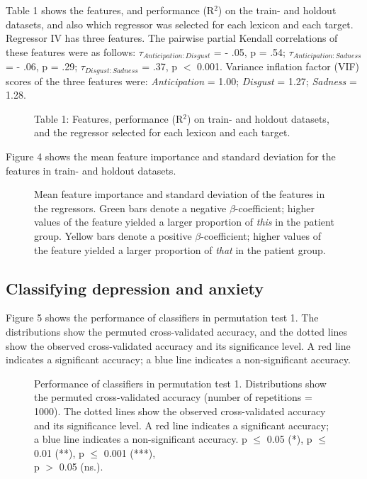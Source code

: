 \documentclass[11pt, a4paper]{article}
\begin{document}
Table 1 shows the features, and performance (R$^2$) on the train- and holdout datasets, and also which regressor was selected for each lexicon and each target.\\
Regressor IV has three features. The pairwise partial Kendall correlations of these features were as follows: $\tau_{Anticipation:Disgust}$ = - .05, p = .54; $\tau_{Anticipation:Sadness}$ = - .06, p = .29; $\tau_{Disgust:Sadness}$ = .37, p $<$ 0.001. Variance inflation factor (VIF) scores of the three features were: \textit{Anticipation} = 1.00; \textit{Disgust} = 1.27; \textit{Sadness} = 1.28. 

\begin{figure}[hbt!]
\centering

\caption*{Table 1:  Features, performance (R$^2$) on train- and holdout datasets, and the regressor selected for each lexicon and each target.}
\end{figure}

Figure 4 shows the mean feature importance and standard deviation for the features in train- and holdout datasets. 

\begin{figure}[hbt!]
\centering

\caption{\label{fig:data} Mean feature importance and standard deviation of the features in the regressors. Green bars denote a negative $\beta$-coefficient; higher values of the feature yielded a larger proportion of \textit{this} in the patient group. Yellow bars denote a positive $\beta$-coefficient; higher values of the feature yielded a larger proportion of \textit{that} in the patient group.}
\end{figure}

\newpage
\subsection{Classifying depression and anxiety}

Figure 5 shows the performance of classifiers in permutation test 1. The distributions show the permuted cross-validated accuracy, and the dotted lines show the observed cross-validated accuracy and its significance level. A red line indicates a significant accuracy; a blue line indicates a non-significant accuracy.

\begin{figure}[hbt!]
\centering

\caption{\label{fig:data} Performance of classifiers in permutation test 1. Distributions show the permuted cross-validated accuracy (number of repetitions = 1000). The dotted lines show the observed cross-validated accuracy and its significance level. A red line indicates a significant accuracy; a blue line indicates a non-significant accuracy. p $\leq$ 0.05 (*), p $\leq$ 0.01 (**), p $\leq$ 0.001 (***), \\ p $>$ 0.05 (ns.).}
\end{figure}
\end{document}

